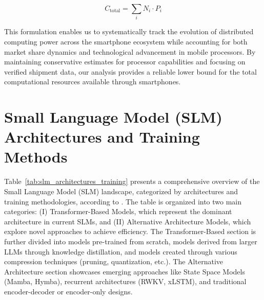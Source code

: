 \begin{equation}
    C_{\text{total}} = \sum_{i} N_i \cdot P_i
\end{equation}

This formulation enables us to systematically track the evolution of distributed computing power across the smartphone ecosystem while accounting for both market share dynamics and technological advancement in mobile processors. By maintaining conservative estimates for processor capabilities and focusing on verified shipment data, our analysis provides a reliable lower bound for the total computational resources available through smartphones.

\section{Small Language Model (SLM) Architectures and Training Methods}
\label{app:slm_architectures_training}

Table~\ref{tab:slm_architectures_training} presents a comprehensive overview of the Small Language Model (SLM) landscape, categorized by architectures and training methodologies, according to \citet{wang2024comprehensive}. The table is organized into two main categories: (I) Transformer-Based Models, which represent the dominant architecture in current SLMs, and (II) Alternative Architecture Models, which explore novel approaches to achieve efficiency. The Transformer-Based section is further divided into models pre-trained from scratch, models derived from larger LLMs through knowledge distillation, and models created through various compression techniques (pruning, quantization, etc.). The Alternative Architecture section showcases emerging approaches like State Space Models (Mamba, Hymba), recurrent architectures (RWKV, xLSTM), and traditional encoder-decoder or encoder-only designs. 


